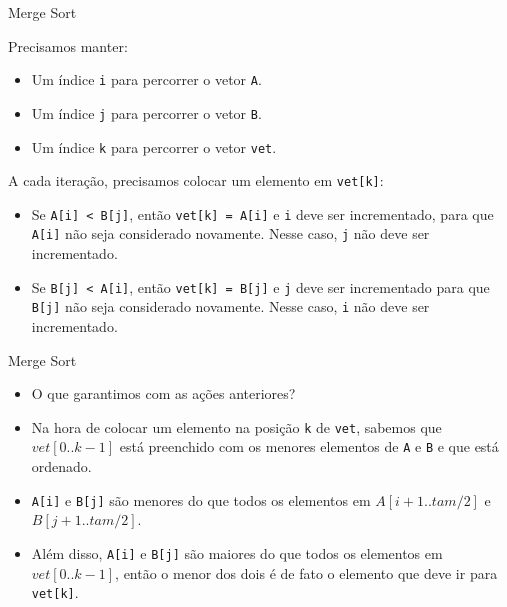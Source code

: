 \documentclass[handout]{beamer}
\newcommand{\cod}[1]{\texttt{#1}}
\begin{document}
\begin{frame}[fragile]{Merge Sort}

    Precisamos manter:
    \begin{itemize}
        \item Um índice \cod{i} para percorrer o vetor \cod{A}.
        \item Um índice \cod{j} para percorrer o vetor \cod{B}.
        \item Um índice \cod{k} para percorrer o vetor \cod{vet}.
    \end{itemize}

    A cada iteração, precisamos colocar um elemento em \cod{vet[k]}:
    \begin{itemize}
        \item Se \cod{A[i] < B[j]}, então \cod{vet[k] = A[i]} e \cod{i} deve ser incrementado, para que \cod{A[i]} não seja considerado novamente.
        Nesse caso, \cod{j} não deve ser incrementado.
        \item Se \cod{B[j] < A[i]}, então \cod{vet[k] = B[j]} e \cod{j} deve ser incrementado para que \cod{B[j]} não seja considerado novamente.
        Nesse caso, \cod{i} não deve ser incrementado.
    \end{itemize}

\end{frame}

\begin{frame}[fragile]{Merge Sort}

    \begin{itemize}
        \item O que garantimos com as ações anteriores?
        \item Na hora de colocar um elemento na posição \cod{k} de \cod{vet}, sabemos que $vet[0..k-1]$ está preenchido com os menores elementos de \cod{A} e \cod{B} e que está ordenado.
        \item \cod{A[i]} e \cod{B[j]} são menores do que todos os elementos em $A[i+1..tam/2]$ e $B[j+1..tam/2]$.
        \item Além disso, \cod{A[i]} e \cod{B[j]} são maiores do que todos os elementos em $vet[0..k-1]$, então o menor dos dois é de fato o elemento que deve ir para \cod{vet[k]}.
    \end{itemize}

\end{frame}
\end{document}
